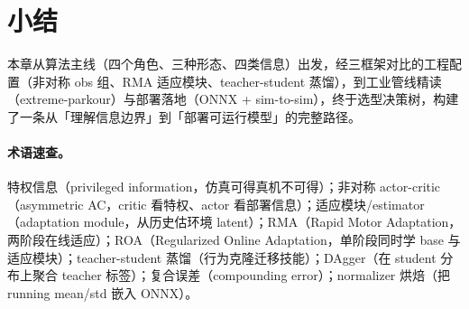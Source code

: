 \section*{小结}
\label{sec:rlmc-priv-summary}

本章从算法主线（四个角色、三种形态、四类信息）出发，经三框架对比的工程配置（非对称 obs 组、RMA 适应模块、teacher-student 蒸馏），到工业管线精读（extreme-parkour）与部署落地（ONNX + sim-to-sim），终于选型决策树，构建了一条从「理解信息边界」到「部署可运行模型」的完整路径。

\paragraph{术语速查。} 特权信息（privileged information，仿真可得真机不可得）；非对称 actor-critic（asymmetric AC，critic 看特权、actor 看部署信息）；适应模块/estimator（adaptation module，从历史估环境 latent）；RMA（Rapid Motor Adaptation，两阶段在线适应）；ROA（Regularized Online Adaptation，单阶段同时学 base 与适应模块）；teacher-student 蒸馏（行为克隆迁移技能）；DAgger（在 student 分布上聚合 teacher 标签）；复合误差（compounding error）；normalizer 烘焙（把 running mean/std 嵌入 ONNX）。

